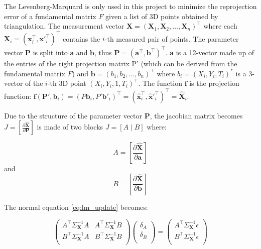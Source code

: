 \documentclass[12pt]{article}
\begin{document}
The Levenberg-Marquard is only used in this project to minimize the reprojection error of a fundamental matrix $F$ given a list of 3D points obtained by triangulation. The measurement vector $\mathbf{X} = (\mathbf{X}_1, \mathbf{X}_2, \hdots, \mathbf{X}_n)^\top$ where each $\mathbf{X}_i = (\mathbf{x}_i^\top, \mathbf{x}'^\top_i)^\top$ contains the $i$-th measured pair of points.
The parameter vector $\mathbf{P}$ is split into $\mathbf{a}$ and $\mathbf{b}$, thus $\mathbf{P}=(\mathbf{a}^\top, \mathbf{b}^\top)^\top$. $\mathbf{a}$ is a 12-vector made up of the entries of the right projection matrix P' (which can be derived from the fundamental matrix $F$) and $\mathbf{b}=(b_1, b_2, \hdots, b_n)^\top$ where $b_i = (X_i, Y_i, T_i)^\ast$ is a 3-vector of the $i$-th 3D point $(X_i, Y_i, 1, T_i)^\top$. The function $\mathbf{f}$ is the projection function: $\mathbf{f}(\mathbf{P}', \mathbf{b}_i) = (P\mathbf{b}_i, P'\mathbf{b}'_i)^\top = (\widehat{\mathbf{x}}_i^\top, \widehat{\mathbf{x}}'^\top_i)^\top = \widehat{\mathbf{X}}_i$.

Due to the structure of the parameter vector $\mathbf{P}$, the jacobian matrix becomes $J = \left [ \frac{\partial\widehat{\mathbf{X}}}{\partial \mathbf{P}} \right ]$ is made of two blocks $J=\left [ A\mid B\right ]$ where:

\[
A = \left [ \frac{\partial\widehat{\mathbf{X}}}{\partial\mathbf{a}}\right ]
\]
and
\[
B = \left [ \frac{\partial\widehat{\mathbf{X}}}{\partial\mathbf{b}}\right ]
\]

The normal equation \ref{eq:lm_update} becomes: 

\begin{equation}
    \label{eq:lm_update2}
    \left ( 
    \begin{matrix}
        A^\top\Sigma^{-1}_{\mathbf{X}}A &  A^\top\Sigma^{-1}_{\mathbf{X}}B \\
        B^\top\Sigma^{-1}_{\mathbf{X}}A &  B^\top\Sigma^{-1}_{\mathbf{X}}B \\
    \end{matrix}
    \right )
    \left (
    \begin{matrix}
      \delta_A \\
      \delta_B \\
    \end{matrix}
    \right )
    =
    \left (
    \begin{matrix}
        A^\top\Sigma^{-1}_{\mathbf{X}}\epsilon \\
        B^\top\Sigma^{-1}_{\mathbf{X}}\epsilon \\
    \end{matrix}
    \right )
\end{equation}
\end{document}
